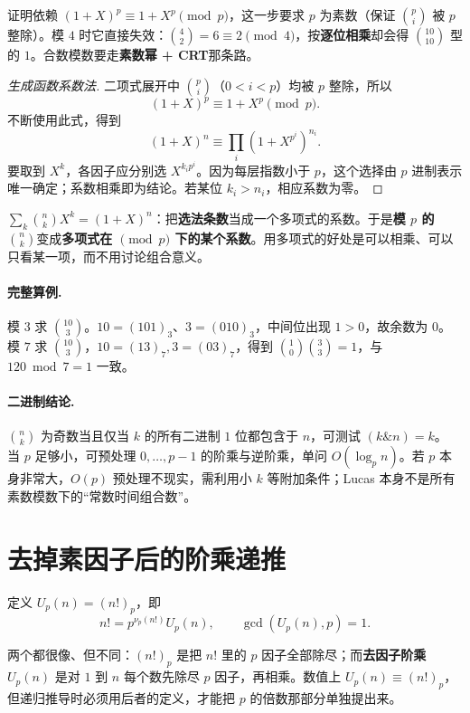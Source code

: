 \begin{tip}
证明依赖 $(1+X)^p\equiv1+X^p\pmod p$，这一步要求 $p$ 为素数（保证 $\binom pi$ 被 $p$ 整除）。模 $4$ 时它直接失效：$\binom42=6\equiv2\pmod4$，按\textbf{逐位相乘}却会得 $\binom{10}{10}$ 型的 $1$。合数模数要走\textbf{素数幂 + CRT}那条路。
\end{tip}


\begin{proof}[生成函数系数法]
二项式展开中 $\binom pi$（$0<i<p$）均被 $p$ 整除，所以
\[
(1+X)^p\equiv1+X^p\pmod p.
\]
不断使用此式，得到
\[
 (1+X)^n\equiv\prod_i(1+X^{p^i})^{n_i}.
\]
要取到 $X^k$，各因子应分别选 $X^{k_ip^i}$。因为每层指数小于 $p$，这个选择由 $p$ 进制表示唯一确定；系数相乘即为结论。若某位 $k_i>n_i$，相应系数为零。
\end{proof}

\begin{tip}
$\sum_k\binom nk X^k=(1+X)^n$：把\textbf{选法条数}当成一个多项式的系数。于是\textbf{模 $p$ 的 $\binom nk$}变成\textbf{多项式在 $\pmod p$ 下的某个系数}。用多项式的好处是可以相乘、可以只看某一项，而不用讨论组合意义。
\end{tip}

\paragraph{完整算例.} 模 $3$ 求 $\binom{10}{3}$。$10=(101)_3$、$3=(010)_3$，中间位出现 $1>0$，故余数为 $0$。模 $7$ 求 $\binom{10}{3}$，$10=(13)_7,3=(03)_7$，得到 $\binom10\binom33=1$，与 $120\bmod7=1$ 一致。
\paragraph{二进制结论.} $\binom nk$ 为奇数当且仅当 $k$ 的所有二进制 $1$ 位都包含于 $n$，可测试 $(k\mathbin{\&}n)=k$。
\cost 当 $p$ 足够小，可预处理 $0,\ldots,p-1$ 的阶乘与逆阶乘，单问 $O(\log_p n)$。若 $p$ 本身非常大，$O(p)$ 预处理不现实，需利用小 $k$ 等附加条件；Lucas 本身不是所有素数模数下的“常数时间组合数”。


\section{去掉素因子后的阶乘递推}
定义 $U_p(n)=(n!)_p$，即
\[
 n!=p^{\nu_p(n!)}U_p(n),\qquad\gcd(U_p(n),p)=1.
\]

\begin{tip}[$(n!)_p$ 与 $U_p(n)$ 的区别]
两个都很像、但不同：$(n!)_p$ 是把 $n!$ 里的 $p$ 因子全部除尽；而\textbf{去因子阶乘}$U_p(n)$ 是对 $1$ 到 $n$ 每个数先除尽 $p$ 因子，再相乘。数值上 $U_p(n)\equiv(n!)_p$，但递归推导时必须用后者的定义，才能把 $p$ 的倍数那部分单独提出来。
\end{tip}

